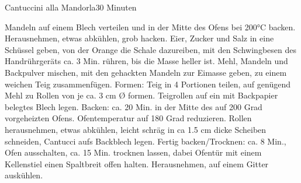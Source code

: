 \RecipeWidths{18cm}{4cm}{0.5cm}{3cm}{1.25cm}{1.8cm}

\begin{recipe}{Cantuccini alla Mandorla}{}{30 Minuten}

Mandeln auf einem Blech verteilen und in der Mitte des Ofens bei 200°C backen. Herausnehmen, etwas abkühlen, grob hacken.
Eier, Zucker und Salz in eine Schüssel geben, von der Orange die Schale dazureiben, 
mit den Schwingbesen des Handrührgeräts ca. 3 Min. rühren, bis die Masse heller ist.
Mehl, Mandeln und Backpulver mischen, mit den gehackten Mandeln zur Eimasse geben, zu einem weichen Teig zusammenfügen.
\ingredient[]{}{}
Formen: Teig in 4 Portionen teilen, auf genügend Mehl zu Rollen von je ca. 3 cm Ø formen. Teigrollen auf ein mit Backpapier belegtes Blech legen.
\ingredient[]{}{}
Backen: ca. 20 Min. in der Mitte des auf 200 Grad vorgeheizten Ofens. Ofentemperatur auf 180 Grad reduzieren. 
Rollen herausnehmen, etwas abkühlen, leicht schräg in ca 1.5 cm dicke Scheiben schneiden, Cantucci aufs Backblech legen.
\ingredient[]{}{}
Fertig backen/Trocknen: ca. 8 Min., Ofen ausschalten, ca. 15 Min. trocknen lassen, dabei Ofentür mit einem Kellenstiel einen Spaltbreit offen halten. 
Herausnehmen, auf einem Gitter auskühlen.

\end{recipe}
